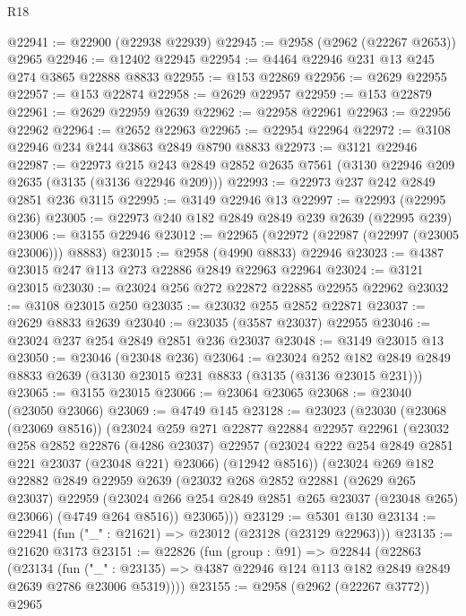 \begin{lexlean}{R18}
\begin{coremodule}
@22941 := @22900 (@22938 @22939)
@22945 := @2958 (@2962 (@22267 @2653)) @2965
@22946 := @12402 @22945
@22954 := @4464 @22946 @231 @13 @245 @274 @3865 @22888 @8833
@22955 := @153 @22869
@22956 := @2629 @22955
@22957 := @153 @22874
@22958 := @2629 @22957
@22959 := @153 @22879
@22961 := @2629 @22959 @2639
@22962 := @22958 @22961
@22963 := @22956 @22962
@22964 := @2652 @22963
@22965 := @22954 @22964
@22972 := @3108 @22946 @234 @244 @3863 @2849 @8790 @8833
@22973 := @3121 @22946
@22987 := @22973
    @215
    @243
    @2849
    @2852
    @2635
    @7561
    (@3130 @22946 @209 @2635 (@3135 (@3136 @22946 @209)))
@22993 := @22973 @237 @242 @2849 @2851 @236 @3115
@22995 := @3149 @22946 @13
@22997 := @22993 (@22995 @236)
@23005 := @22973 @240 @182 @2849 @2849 @239 @2639 (@22995 @239)
@23006 := @3155 @22946
@23012 := @22965 (@22972 (@22987 (@22997 (@23005 @23006))) @8883)
@23015 := @2958 (@4990 @8833) @22946
@23023 := @4387 @23015 @247 @113 @273 @22886 @2849 @22963 @22964
@23024 := @3121 @23015
@23030 := @23024 @256 @272 @22872 @22885 @22955 @22962
@23032 := @3108 @23015 @250
@23035 := @23032 @255 @2852 @22871
@23037 := @2629 @8833 @2639
@23040 := @23035 (@3587 @23037) @22955
@23046 := @23024 @237 @254 @2849 @2851 @236 @23037
@23048 := @3149 @23015 @13
@23050 := @23046 (@23048 @236)
@23064 := @23024
    @252
    @182
    @2849
    @2849
    @8833
    @2639
    (@3130 @23015 @231 @8833 (@3135 (@3136 @23015 @231)))
@23065 := @3155 @23015
@23066 := @23064 @23065
@23068 := @23040 (@23050 @23066)
@23069 := @4749 @145
@23128 := @23023
    (@23030
      (@23068 (@23069 @8516))
      (@23024
        @259
        @271
        @22877
        @22884
        @22957
        @22961
        (@23032
          @258
          @2852
          @22876
          (@4286 @23037)
          @22957
          (@23024 @222 @254 @2849 @2851 @221 @23037 (@23048 @221) @23066)
          (@12942 @8516))
        (@23024
          @269
          @182
          @22882
          @2849
          @22959
          @2639
          (@23032
            @268
            @2852
            @22881
            (@2629 @265 @23037)
            @22959
            (@23024 @266 @254 @2849 @2851 @265 @23037 (@23048 @265) @23066)
            (@4749 @264 @8516))
          @23065)))
@23129 := @5301 @130
@23134 := @22941 (fun ("_" : @21621) => @23012 (@23128 (@23129 @22963)))
@23135 := @21620 @3173
@23151 := @22826
    (fun (group : @91) =>
    @22844
      (@22863
        (@23134
          (fun ("_" : @23135) =>
          @4387 @22946 @124 @113 @182 @2849 @2849 @2639 @2786 @23006 @5319))))
@23155 := @2958 (@2962 (@22267 @3772)) @2965

\end{coremodule}
\end{lexlean}
